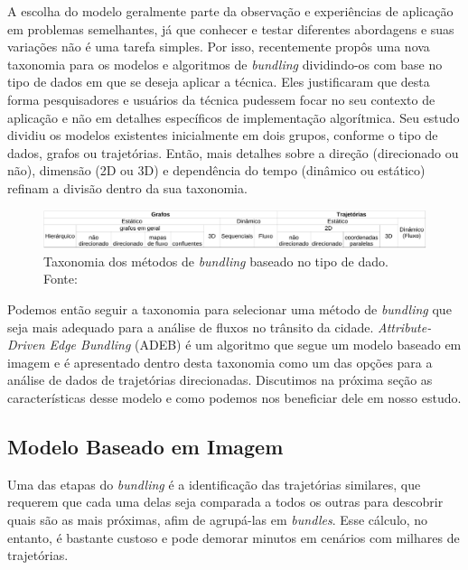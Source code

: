   A escolha do modelo geralmente parte da observação e experiências de
aplicação em problemas semelhantes, já que conhecer e testar diferentes
abordagens e suas variações não é uma tarefa simples. Por isso,
\citet{Lhuillier2017} recentemente propôs uma nova taxonomia para os modelos e
algoritmos de \emph{bundling} dividindo-os com base no tipo de dados em que se deseja
aplicar a técnica. Eles justificaram que desta forma pesquisadores e usuários
da técnica pudessem focar no seu contexto de aplicação e não em detalhes
específicos de implementação algorítmica. Seu estudo dividiu os modelos
existentes inicialmente em dois grupos, conforme o tipo de dados, grafos ou
trajetórias. Então, mais detalhes sobre a direção (direcionado ou não),
dimensão (2D ou 3D) e dependência do tempo (dinâmico ou estático) refinam a
divisão dentro da sua taxonomia.


\begin{figure}[!htb]
  \centering
  \includegraphics[width=\textwidth]{../figuras/estado-da-arte.pdf}
  \caption[Taxonomia dos métodos de \emph{bundling} baseado no tipo de dado]{Taxonomia dos métodos de \emph{bundling} baseado no tipo de dado. Fonte: \citet{Lhuillier2017}}
  \label{table:bundling-methods}
\end{figure}


Podemos então seguir a taxonomia para selecionar uma método de
\emph{bundling} que seja mais adequado para a análise de fluxos no trânsito da
cidade. \emph{Attribute-Driven Edge Bundling} (ADEB) é um algoritmo que segue um
modelo baseado em imagem e é apresentado dentro desta taxonomia como um das
opções para a análise de dados de trajetórias direcionadas. Discutimos na
próxima seção as características desse modelo e como podemos nos beneficiar
dele em nosso estudo.

\subsection{Modelo Baseado em Imagem}
\label{sec:modelo-imagem}

  Uma das etapas do \emph{bundling} é a identificação das trajetórias
similares, que requerem que cada uma delas seja comparada a todos os outras
para descobrir quais são as mais próximas, afim de agrupá-las em
\emph{bundles}.  Esse cálculo, no entanto, é bastante custoso e pode demorar
minutos em cenários com milhares de trajetórias.

